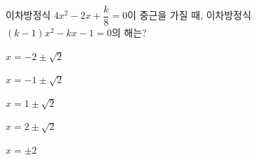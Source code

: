 이차방정식 $4x^2-2x+\dfrac{k}{8}=0$이 중근을 가질 때, 이차방정식 $(k-1)x^2-kx-1=0$의 해는? 
\begin{choicesii}{\rule[-3ex]{0pt}{8ex}$x=-2\pm\sqrt{2}$}{\rule[-3ex]{0pt}{8ex}$x=-1\pm\sqrt{2}$}{\rule[-3ex]{0pt}{8ex}$x=1\pm\sqrt{2}$}{\rule[-3ex]{0pt}{8ex}$x=2\pm\sqrt{2}$}{\rule[-3ex]{0pt}{8ex}$x=\pm2$}\end{choicesii}
